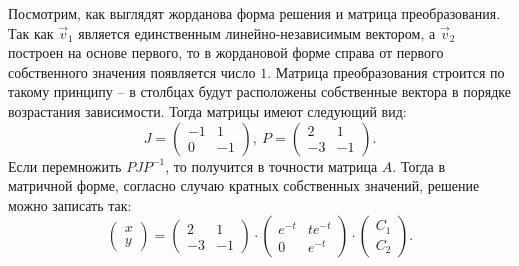 \begin{enumerate}
				Посмотрим, как выглядят жорданова форма решения и матрица преобразования. Так как $\vec{v}_1$ является единственным линейно-независимым вектором, а $\vec{v}_2$ построен на основе первого, то в жордановой форме справа от первого собственного значения появляется число $1$. Матрица преобразования строится по такому принципу -- в столбцах будут расположены собственные вектора в порядке возрастания зависимости. Тогда матрицы имеют следующий вид:
				\[ J = \begin{pmatrix} -1 & 1 \\ 0 & -1 \end{pmatrix}, ~ P = \begin{pmatrix} 2 & 1 \\ -3 & -1 \end{pmatrix}. \]
				Если перемножить $PJP^{-1}$, то получится в точности матрица $A$. Тогда в матричной форме, согласно случаю кратных собственных значений, решение можно записать так:
				\[ \begin{pmatrix} x \\ y \end{pmatrix} = \begin{pmatrix} 2 & 1 \\ -3 & -1 \end{pmatrix} \cdot \begin{pmatrix} e^{-t} & t e^{-t} \\ 0 & e^{-t} \end{pmatrix} \cdot \begin{pmatrix} C_1 \\ C_2 \end{pmatrix}. \]
				

\end{enumerate}
